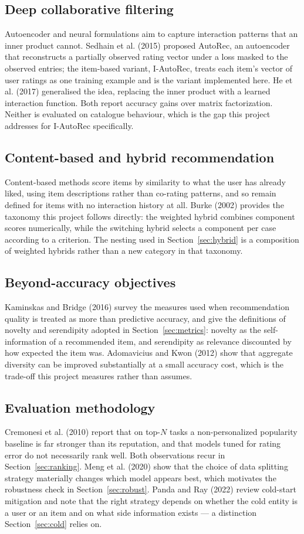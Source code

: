 \documentclass[10pt,twocolumn,letterpaper]{article}
\begin{document}
\subsection{Deep collaborative filtering}
Autoencoder and neural formulations aim to capture interaction patterns that
an inner product cannot. Sedhain et al. (2015) proposed AutoRec, an
autoencoder that reconstructs a partially observed rating vector under a loss
masked to the observed entries; the item-based variant, I-AutoRec, treats each
item's vector of user ratings as one training example and is the variant
implemented here. He et al. (2017) generalised the idea, replacing the inner
product with a learned interaction function. Both report accuracy gains over
matrix factorization. Neither is evaluated on catalogue behaviour, which is
the gap this project addresses for I-AutoRec specifically.

\subsection{Content-based and hybrid recommendation}
Content-based methods score items by similarity to what the user has already
liked, using item descriptions rather than co-rating patterns, and so remain
defined for items with no interaction history at all. Burke (2002) provides
the taxonomy this project follows directly: the weighted hybrid combines
component scores numerically, while the switching hybrid selects a component
per case according to a criterion. The nesting used in
Section~\ref{sec:hybrid} is a composition of weighted hybrids rather than a
new category in that taxonomy.

\subsection{Beyond-accuracy objectives}
Kaminskas and Bridge (2016) survey the measures used when recommendation
quality is treated as more than predictive accuracy, and give the definitions
of novelty and serendipity adopted in Section~\ref{sec:metrics}: novelty as
the self-information of a recommended item, and serendipity as relevance
discounted by how expected the item was. Adomavicius and Kwon (2012) show
that aggregate diversity can be improved substantially at a small accuracy
cost, which is the trade-off this project measures rather than assumes.

\subsection{Evaluation methodology}
Cremonesi et al. (2010) report that on top-$N$ tasks a non-personalized
popularity baseline is far stronger than its reputation, and that models tuned
for rating error do not necessarily rank well. Both observations recur in
Section~\ref{sec:ranking}. Meng et al. (2020) show that the choice of data
splitting strategy materially changes which model appears best, which
motivates the robustness check in Section~\ref{sec:robust}. Panda and Ray
(2022) review cold-start mitigation and note that the right strategy depends
on whether the cold entity is a user or an item and on what side information
exists --- a distinction Section~\ref{sec:cold} relies on.
\end{document}
